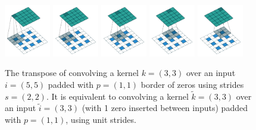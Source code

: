 \begin{figure}
	\includegraphics[width=0.18\textwidth]{figures/padding_strides_transposed_00}
	\includegraphics[width=0.18\textwidth]{figures/padding_strides_transposed_01}
	\includegraphics[width=0.18\textwidth]{figures/padding_strides_transposed_02}
	\includegraphics[width=0.18\textwidth]{figures/padding_strides_transposed_03}
	\includegraphics[width=0.18\textwidth]{figures/padding_strides_transposed_04}
	\caption{ The transpose of convolving a kernel $k=(3,3)$ over an input $i=(5,5)$ padded
with $p=(1,1)$ border of zeros using strides $s=(2,2)$. It is equivalent to convolving a kernel $\tilde{k} = (3,3)$ over an input $\tilde{i} = (3,3)$ (with 1 zero inserted between inputs) padded with $p=(1,1)$, using unit strides.}
	\label{fig:conv_padding_strides_transposed}
\end{figure}

